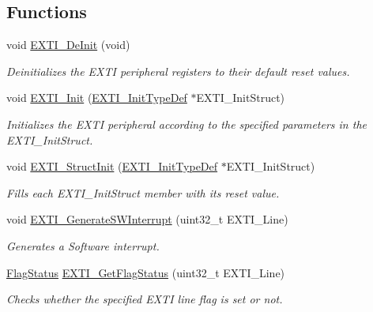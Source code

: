 \subsection*{Functions}
\begin{DoxyCompactItemize}
\item 
void \hyperlink{group___e_x_t_i___private___functions_ga07072e339cb9ecb9cd9d4b94afc9f317}{E\+X\+T\+I\+\_\+\+De\+Init} (void)
\begin{DoxyCompactList}\small\item\em Deinitializes the E\+X\+TI peripheral registers to their default reset values. \end{DoxyCompactList}\item 
void \hyperlink{group___e_x_t_i___private___functions_ga8c9ce6352a3a2dfc8fc9287cb24c6501}{E\+X\+T\+I\+\_\+\+Init} (\hyperlink{struct_e_x_t_i___init_type_def}{E\+X\+T\+I\+\_\+\+Init\+Type\+Def} $\ast$E\+X\+T\+I\+\_\+\+Init\+Struct)
\begin{DoxyCompactList}\small\item\em Initializes the E\+X\+TI peripheral according to the specified parameters in the E\+X\+T\+I\+\_\+\+Init\+Struct. \end{DoxyCompactList}\item 
void \hyperlink{group___e_x_t_i___private___functions_ga86b9e662d18a2f829999cfb26aa7ca20}{E\+X\+T\+I\+\_\+\+Struct\+Init} (\hyperlink{struct_e_x_t_i___init_type_def}{E\+X\+T\+I\+\_\+\+Init\+Type\+Def} $\ast$E\+X\+T\+I\+\_\+\+Init\+Struct)
\begin{DoxyCompactList}\small\item\em Fills each E\+X\+T\+I\+\_\+\+Init\+Struct member with its reset value. \end{DoxyCompactList}\item 
void \hyperlink{group___e_x_t_i___private___functions_ga897e8ea59f40a19e047fb9994876fc9b}{E\+X\+T\+I\+\_\+\+Generate\+S\+W\+Interrupt} (uint32\+\_\+t E\+X\+T\+I\+\_\+\+Line)
\begin{DoxyCompactList}\small\item\em Generates a Software interrupt. \end{DoxyCompactList}\item 
\hyperlink{group___exported__types_ga89136caac2e14c55151f527ac02daaff}{Flag\+Status} \hyperlink{group___e_x_t_i___private___functions_ga0ce06e6b312592df149800d63218cffa}{E\+X\+T\+I\+\_\+\+Get\+Flag\+Status} (uint32\+\_\+t E\+X\+T\+I\+\_\+\+Line)
\begin{DoxyCompactList}\small\item\em Checks whether the specified E\+X\+TI line flag is set or not. \end{DoxyCompactList}\item 

\end{DoxyCompactItemize}
